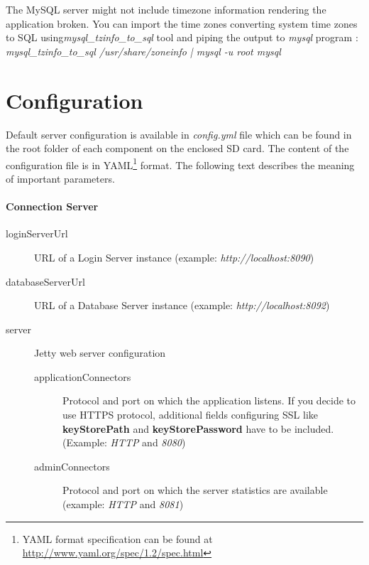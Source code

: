 The MySQL server might not include timezone information rendering the application broken. You can import the time zones converting system time zones to SQL using\textit{mysql\_tzinfo\_to\_sql} tool and piping the output to \textit{mysql} program \cite{mysqltimezones}:\\
\emph{mysql\_tzinfo\_to\_sql /usr/share/zoneinfo | mysql -u root mysql}

\section{Configuration}
Default server configuration is available in \textit{config.yml} file which can be found in the root folder of each component on the enclosed SD card. The content of the configuration file is in YAML\footnote{YAML format specification can be found at \url{http://www.yaml.org/spec/1.2/spec.html}} format. The following text describes the meaning of important parameters.

\paragraph*{Connection Server}
\begin{description}
	\item[loginServerUrl] URL of a Login Server instance (example: \textit{http://localhost:8090})
	\item[databaseServerUrl] URL of a Database Server instance (example: \textit{http://localhost:8092})
	\item[server] Jetty web server configuration
		\begin{description}
			\item[applicationConnectors] Protocol and port on which the application listens. If you decide to use HTTPS protocol, additional fields configuring SSL like \textbf{keyStorePath} and \textbf{keyStorePassword} have to be included. (Example: \textit{HTTP} and \textit{8080})
			\item[adminConnectors] Protocol and port on which the server statistics are available  (example: \textit{HTTP} and \textit{8081})
		\end{description}
\end{description}

